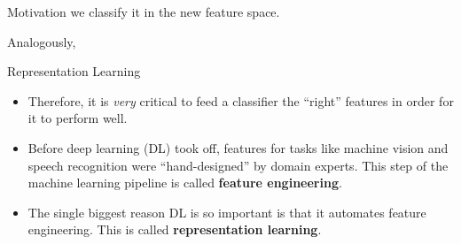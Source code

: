 \begin{frame} {Motivation}
   \small{we classify it in the new feature space.}
  \begin{figure}
    \centering
  \end{figure}
  \small{Analogously, }
  \begin{figure}
    \centering
  \end{figure}
\end{frame}

\begin{frame} {Representation Learning}
  \begin{itemize}
    \vspace{5mm}
    \item Therefore, it is \textit{very} critical to feed a classifier the \enquote{right} features in order for it to perform well.
    \vspace{7mm}
    \item Before deep learning (DL) took off, features for tasks like machine vision and speech recognition were \enquote{hand-designed} by domain experts. This step of the machine learning pipeline is called \textbf{feature engineering}.
    \vspace{7mm}
    \item The single biggest reason DL is so important is that it automates feature engineering. This is called \textbf{representation learning}.
  \end{itemize}
\end{frame}



